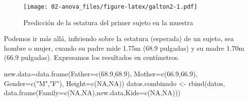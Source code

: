 \documentclass[
]{book}
\newenvironment{Shaded}{\begin{snugshade}}{\end{snugshade}}
\newcommand{\AttributeTok}[1]{\textcolor[rgb]{0.77,0.63,0.00}{#1}}
\newcommand{\ConstantTok}[1]{\textcolor[rgb]{0.00,0.00,0.00}{#1}}
\newcommand{\FloatTok}[1]{\textcolor[rgb]{0.00,0.00,0.81}{#1}}
\newcommand{\FunctionTok}[1]{\textcolor[rgb]{0.00,0.00,0.00}{#1}}
\newcommand{\NormalTok}[1]{#1}
\newcommand{\OtherTok}[1]{\textcolor[rgb]{0.56,0.35,0.01}{#1}}
\newcommand{\StringTok}[1]{\textcolor[rgb]{0.31,0.60,0.02}{#1}}
\begin{document}
\begin{figure}
\centering
\texttt{[image: 02-anova\_files/figure-latex/galton2-1.pdf]}
\caption{\label{fig:galton2}Predicción de la estatura del primer sujeto en la muestra}
\end{figure}

Podemos ir más allá, infiriendo sobre la estatura (esperada) de un sujeto, sea hombre o mujer, cuando su padre mide 1.75m (68.9 pulgadas) y su madre 1.70m (66.9 pulgadas). Expresamos los resultados en centímetros.

\begin{Shaded}
\begin{Highlighting}[]
\NormalTok{new.data}\OtherTok{=}\FunctionTok{data.frame}\NormalTok{(}\AttributeTok{Father=}\FunctionTok{c}\NormalTok{(}\FloatTok{68.9}\NormalTok{,}\FloatTok{68.9}\NormalTok{),}
                    \AttributeTok{Mother=}\FunctionTok{c}\NormalTok{(}\FloatTok{66.9}\NormalTok{,}\FloatTok{66.9}\NormalTok{),}
                    \AttributeTok{Gender=}\FunctionTok{c}\NormalTok{(}\StringTok{"M"}\NormalTok{,}\StringTok{"F"}\NormalTok{),}
                    \AttributeTok{Height=}\FunctionTok{c}\NormalTok{(}\ConstantTok{NA}\NormalTok{,}\ConstantTok{NA}\NormalTok{))}
\NormalTok{datos.combinado }\OtherTok{\textless{}{-}} \FunctionTok{rbind}\NormalTok{(datos, }\FunctionTok{data.frame}\NormalTok{(}\AttributeTok{Family=}\FunctionTok{c}\NormalTok{(}\ConstantTok{NA}\NormalTok{,}\ConstantTok{NA}\NormalTok{),new.data,}\AttributeTok{Kids=}\FunctionTok{c}\NormalTok{(}\ConstantTok{NA}\NormalTok{,}\ConstantTok{NA}\NormalTok{)))}


\end{Highlighting}
\end{Shaded}
\end{document}

